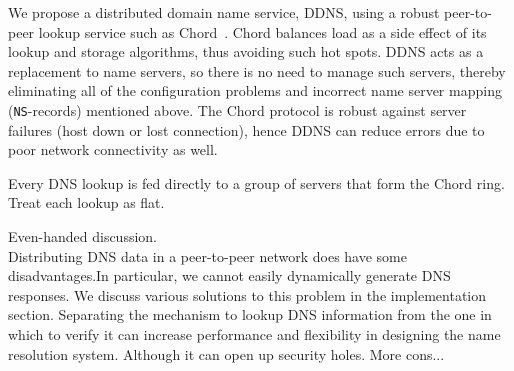 We propose a distributed domain name service, DDNS,
using a robust peer-to-peer lookup service such as Chord~\cite{chord:sigcomm}.
Chord balances load as a side effect of its lookup and storage 
algorithms, thus avoiding such hot spots.
DDNS acts as a replacement to name servers, so there is no need 
to manage such servers, thereby eliminating all of 
the configuration problems and incorrect name server mapping 
({\tt NS}-records) mentioned above. 
The Chord protocol is robust against server failures 
(host down or lost connection),
hence DDNS can reduce errors due to poor network connectivity as well.

Every DNS lookup is fed directly to a group of servers that form
the Chord ring. Treat each lookup as flat.
 
Even-handed discussion.\\
Distributing DNS data in a peer-to-peer network does have some
disadvantages.In particular, we cannot easily dynamically 
generate DNS responses. We discuss various solutions to 
this problem in the implementation section.
Separating the mechanism to lookup DNS information from the one 
in which to verify it can increase performance and flexibility 
in designing the name resolution system. Although it can open up 
security holes. More cons...




